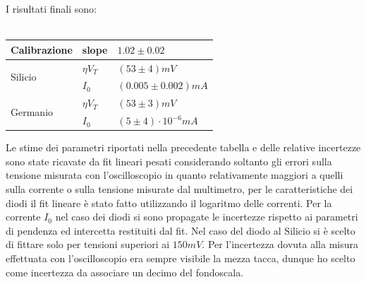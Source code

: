 \documentclass{amsart}
\begin{document}
    I risultati finali sono:\\
    \hfill \\
    \begin{center}
        \begin{tabular}{|p{2cm}|p{1cm}|p{3cm}|}
            \hline
            Calibrazione & slope & $1.02 \pm 0.02$ \\
            \hline
            \multirow{2}{*}{Silicio}      & $\eta V_T$ & $(53 \pm 4)mV$ \\
                                        & $I_0$ & $(0.005 \pm 0.002) mA $ \\
            \hline
            \multirow{2}{*}{Germanio}      & $\eta V_T$ & $(53 \pm 3)mV$ \\
                                        & $I_0$ & $ (5 \pm 4) \cdot 10^{-6} mA$\\
            \hline  
        \end{tabular}
    \end{center}
    \vspace{0.5cm}
    Le stime dei parametri riportati nella precedente tabella e delle relative incertezze sono state ricavate da fit lineari pesati
    considerando soltanto gli errori sulla tensione misurata con l'oscilloscopio in quanto relativamente maggiori 
    a quelli sulla corrente o sulla tensione misurate dal multimetro, per le caratteristiche dei diodi il fit lineare è stato 
    fatto utilizzando il logaritmo delle correnti. Per la corrente $I_0$ nel caso dei diodi si sono propagate le incertezze rispetto
    ai parametri di pendenza ed intercetta restituiti dal fit. Nel caso del diodo al Silicio si è scelto di fittare solo per tensioni
    superiori ai $150mV$. Per l'incertezza dovuta alla misura effettuata con l'oscilloscopio era sempre visibile la mezza tacca, dunque ho scelto 
    come incertezza da associare un decimo del fondoscala.
\end{document}

